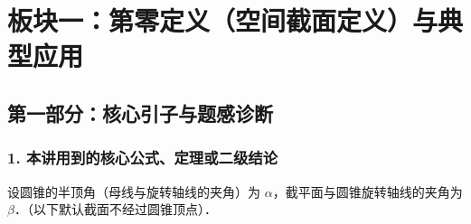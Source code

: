 \documentclass[11pt,a4paper]{ctexart}
\begin{document}
\newpage

\section{板块一：第零定义（空间截面定义）与典型应用}

\subsection*{第一部分：核心引子与题感诊断}

\subsubsection*{1. 本讲用到的核心公式、定理或二级结论}

设圆锥的半顶角（母线与旋转轴线的夹角）为 $\alpha$，截平面与圆锥旋转轴线的夹角为 $\beta$．（以下默认截面不经过圆锥顶点）．
\end{document}
